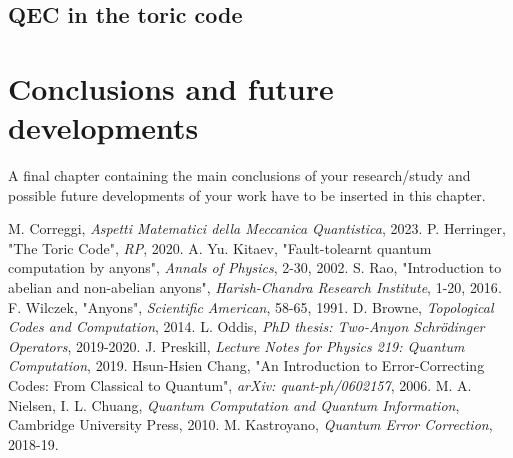 \documentclass{Configuration_Files/PoliMi3i_thesis}
\begin{document}


\newpage
\section{QEC in the toric code}
\label{sec:TC}













\chapter{Conclusions and future developments}
\label{ch:conclusions}%
A final chapter containing the main conclusions of your research/study
and possible future developments of your work have to be inserted in this chapter.


\begin{thebibliography}{99} %
	 M. Correggi, \textit{Aspetti Matematici della Meccanica Quantistica}, 2023.
	 P. Herringer, "The Toric Code", {\it RP}, 2020.
	 A. Yu. Kitaev, "Fault-tolearnt quantum computation by anyons", {\it Annals of Physics}, 2-30, 2002.
	 S. Rao, "Introduction to abelian and non-abelian anyons", {\it Harish-Chandra Research Institute}, 1-20, {2016}.
	 F. Wilczek, "Anyons", {\it Scientific American}, 58-65, 1991.
	 D. Browne, {\it Topological Codes and Computation}, 2014.
	 L. Oddis, {\it PhD thesis: Two-Anyon Schrödinger Operators}, 2019-2020.
	 J. Preskill, {\it Lecture Notes for Physics 219:
	 Quantum Computation}, 2019.
	 Hsun-Hsien Chang, "An Introduction to Error-Correcting Codes: From Classical to Quantum", {\it arXiv: quant-ph/0602157}, 2006.
	 M. A. Nielsen, I. L. Chuang, {\it Quantum Computation and Quantum Information}, Cambridge University Press, 2010.
	 M. Kastroyano, {\it Quantum Error Correction}, 2018-19.
\end{thebibliography}
\end{document}
